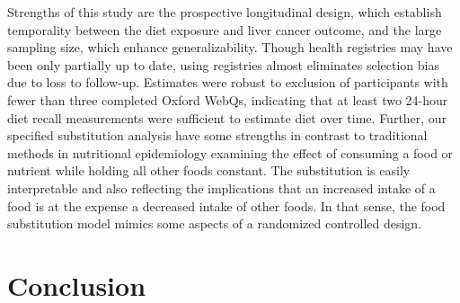 \documentclass[sn-basic,Numbered,iicol,pdflatex]{sn-jnl}
\begin{document}
Strengths of this study are the prospective longitudinal design, which
establish temporality between the diet exposure and liver cancer
outcome, and the large sampling size, which enhance generalizability.
Though health registries may have been only partially up to date, using
registries almost eliminates selection bias due to loss to follow-up.
Estimates were robust to exclusion of participants with fewer than three
completed Oxford WebQs, indicating that at least two 24-hour diet recall
measurements were sufficient to estimate diet over time. Further, our
specified substitution analysis have some strengths in contrast to
traditional methods in nutritional epidemiology examining the effect of
consuming a food or nutrient while holding all other foods constant. The
substitution is easily interpretable and also reflecting the
implications that an increased intake of a food is at the expense a
decreased intake of other foods. In that sense, the food substitution
model mimics some aspects of a randomized controlled design.

\hypertarget{sec5}{%
\section{Conclusion}\label{sec5}}

\renewcommand\refname{Acknowledgements}

\end{document}
